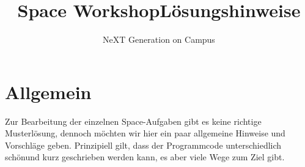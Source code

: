 \documentclass[
    DIV=calc,
    IMRAD=false,
	ngerman,
	accentcolor=1c,%
	marginpar=false,
	identbarcolor=1c,
	]{tudapub}
\begin{document}




\title{Space Workshop\newline L\"osungshinweise}
\subtitle{NeXT Generation on Campus}
\date{}





\maketitle


\newpage
\section{Allgemein}
Zur Bearbeitung der einzelnen Space-Aufgaben gibt es keine richtige Musterl\"osung, dennoch m\"ochten wir hier ein paar allgemeine Hinweise und Vorschl\"age geben. Prinzipiell gilt, dass der Programmcode unterschiedlich \glqq{}sch\"on\grqq und kurz geschrieben werden kann, es aber viele Wege zum Ziel gibt.
\end{document}
